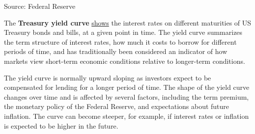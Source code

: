 \documentclass{report}
\begin{document}
{\begin{minipage}{0.98\textwidth}
\vspace{-2mm}		
\footnotesize{Source: Federal Reserve}
\end{minipage}
\newpage
\begin{minipage}{0.76\textwidth}  
\small The \textbf{Treasury yield curve} \href{https://www.treasury.gov/resource-center/data-chart-center/interest-rates/Pages/TextView.aspx?data=yield}{shows} the interest rates on different maturities of US Treasury bonds and bills, at a given point in time. The yield curve summarizes the term structure of interest rates, how much it costs to borrow for different periods of time, and has traditionally been considered an indicator of how markets view short-term economic conditions relative to longer-term conditions. 

The yield curve is normally upward sloping as investors expect to be compensated for lending for a longer period of time. The shape of the yield curve changes over time and is affected by several factors, including the term premium, the monetary policy of the Federal Reserve, and expectations about future inflation. The curve can become steeper, for example, if interest rates or inflation is expected to be higher in the future. 
\end{minipage}

\begin{minipage}{0.43\textwidth} 
\vspace{-2.5mm}


\end{minipage}}
\end{document}
